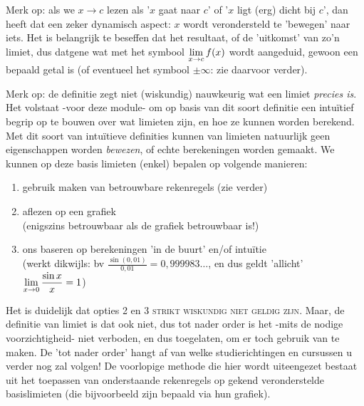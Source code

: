 \documentclass[numbers]{ximera}
\begin{document}
Merk op: als we  $x\to c$ lezen als '$x$ gaat naar $c$' of '$x$ ligt (erg) dicht bij $c$', dan heeft dat een zeker dynamisch aspect: $x$ wordt verondersteld te 'bewegen' naar iets. Het is belangrijk te beseffen dat het resultaat, of de 'uitkomst' van zo'n limiet, dus datgene wat met het symbool $\limxc f(x)$ wordt aangeduid, gewoon een bepaald getal is (of eventueel het symbool $\pm\infty$: zie daarvoor verder).


Merk op: de definitie zegt niet (wiskundig) nauwkeurig wat een limiet \textit{precies is}. Het volstaat -voor deze module- om op basis van dit soort definitie een intuïtief begrip op te bouwen over wat limieten zijn, en hoe ze kunnen worden berekend. Met dit soort van intuïtieve definities kunnen van limieten natuurlijk geen eigenschappen worden \textit{bewezen}, of echte berekeningen worden gemaakt. We kunnen op deze basis limieten (enkel) bepalen op volgende manieren:
\begin{enumerate}
	\item gebruik maken van betrouwbare rekenregels (zie verder)
	\item aflezen op een grafiek  
	\\(enigszins betrouwbaar als de grafiek betrouwbaar is!)
	\item ons baseren op berekeningen 'in de buurt' en/of intuïtie 
	\\(werkt dikwijls: bv $\frac{\sin(0,01)}{0,01}=0,999983\dots$, en dus geldt 'allicht' $\limx \frac{\sin x}{x} = 1$)
\end{enumerate}
Het is duidelijk dat opties 2 en  3 \textsc{strikt wiskundig niet geldig zijn}. Maar, de definitie van limiet is dat ook niet, dus tot nader order is het -mits de nodige voorzichtigheid- niet verboden, en dus toegelaten, om er toch gebruik van te maken. De 'tot nader order' hangt af van welke studierichtingen en cursussen u verder nog zal volgen! De voorlopige methode die hier wordt uiteengezet bestaat uit het toepassen van onderstaande rekenregels op gekend veronderstelde basislimieten (die bijvoorbeeld zijn bepaald via hun grafiek). 
\end{document}
